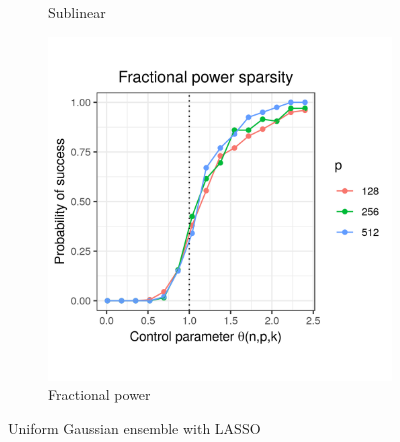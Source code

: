 \documentclass{beamer}
\begin{document}
\begin{frame}
\begin{figure}[h]
\begin{subfigure}{0.32\textwidth}
    \caption{Sublinear}
  \end{subfigure}
  \begin{subfigure}{0.32\textwidth}
    \includegraphics[width=0.9\linewidth]{uniform_fractional_power_sparsity_alpha_1}
    \caption{Fractional power}
  \end{subfigure}
  \caption{Uniform Gaussian ensemble with LASSO}
\end{figure}

\end{frame}
\end{document}
